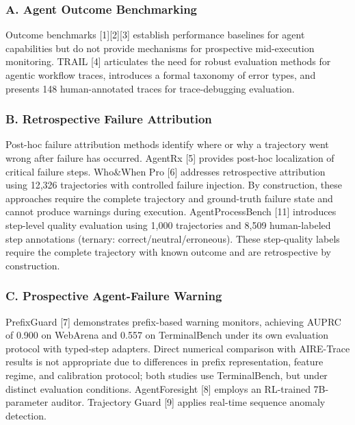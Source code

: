 \documentclass[
]{article}
\begin{document}
\subsubsection{A. Agent Outcome
Benchmarking}\label{a.-agent-outcome-benchmarking}

Outcome benchmarks {[}1{]}{[}2{]}{[}3{]} establish performance baselines
for agent capabilities but do not provide mechanisms for prospective
mid-execution monitoring. TRAIL {[}4{]} articulates the need for robust
evaluation methods for agentic workflow traces, introduces a formal
taxonomy of error types, and presents 148 human-annotated traces for
trace-debugging evaluation.

\subsubsection{B. Retrospective Failure
Attribution}\label{b.-retrospective-failure-attribution}

Post-hoc failure attribution methods identify where or why a trajectory
went wrong after failure has occurred. AgentRx {[}5{]} provides post-hoc
localization of critical failure steps. Who\&When Pro {[}6{]} addresses
retrospective attribution using 12,326 trajectories with controlled
failure injection. By construction, these approaches require the
complete trajectory and ground-truth failure state and cannot produce
warnings during execution. AgentProcessBench {[}11{]} introduces
step-level quality evaluation using 1,000 trajectories and 8,509
human-labeled step annotations (ternary: correct/neutral/erroneous).
These step-quality labels require the complete trajectory with known
outcome and are retrospective by construction.

\subsubsection{C. Prospective Agent-Failure
Warning}\label{c.-prospective-agent-failure-warning}

PrefixGuard {[}7{]} demonstrates prefix-based warning monitors,
achieving AUPRC of 0.900 on WebArena and 0.557 on TerminalBench under
its own evaluation protocol with typed-step adapters. Direct numerical
comparison with AIRE-Trace results is not appropriate due to differences
in prefix representation, feature regime, and calibration protocol; both
studies use TerminalBench, but under distinct evaluation conditions.
AgentForesight {[}8{]} employs an RL-trained 7B-parameter auditor.
Trajectory Guard {[}9{]} applies real-time sequence anomaly detection.
\end{document}
